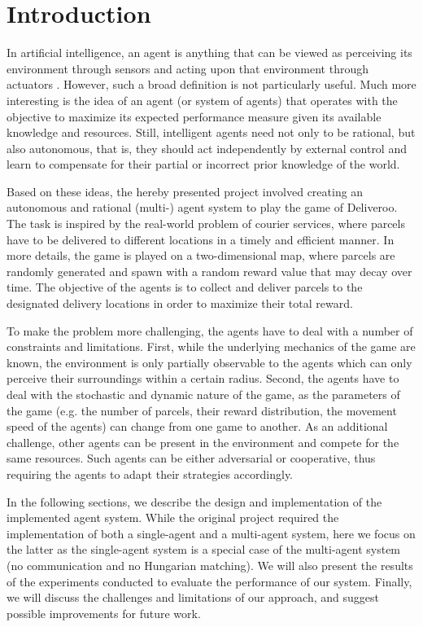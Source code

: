 \section{Introduction}

In artificial intelligence, an agent is anything that can be viewed as perceiving its environment through sensors and acting upon that environment through actuators \parencite{russel2010}. However, such a broad definition is not particularly useful. Much more interesting is the idea of an agent (or system of agents) that operates with the objective to maximize its expected performance measure given its available knowledge and resources. Still, intelligent agents need not only to be rational, but also autonomous, that is, they should act independently by external control and learn to compensate for their partial or incorrect prior knowledge of the world.

Based on these ideas, the hereby presented project involved creating an autonomous and rational (multi-) agent system to play the game of Deliveroo. The task is inspired by the real-world problem of courier services, where parcels have to be delivered to different locations in a timely and efficient manner. In more details, the game is played on a two-dimensional map, where parcels are randomly generated and spawn with a random reward value that may decay over time. The objective of the agents is to collect and deliver parcels to the designated delivery locations in order to maximize their total reward.

To make the problem more challenging, the agents have to deal with a number of constraints and limitations. First, while the underlying mechanics of the game are known, the environment is only partially observable to the agents which can only perceive their surroundings within a certain radius. Second, the agents have to deal with the stochastic and dynamic nature of the game, as the parameters of the game (e.g. the number of parcels, their reward distribution, the movement speed of the agents) can change from one game to another. As an additional challenge, other agents can be present in the environment and compete for the same resources. Such agents can be either adversarial or cooperative, thus requiring the agents to adapt their strategies accordingly.

In the following sections, we describe the design and implementation of the implemented agent system. While the original project required the implementation of both a single-agent and a multi-agent system, here we focus on the latter as the single-agent system is a special case of the multi-agent system (no communication and no Hungarian matching). We will also present the results of the experiments conducted to evaluate the performance of our system. Finally, we will discuss the challenges and limitations of our approach, and suggest possible improvements for future work.